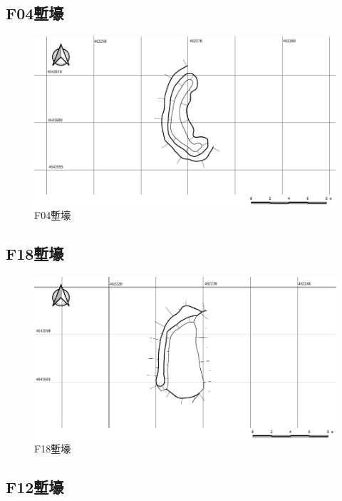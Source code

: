 \documentclass[14Q]{jsarticle}
\begin{document}
\subsection{F04塹壕}

\begin{figure}[h]
\centering
\includegraphics[width=160truemm]{fig/F04.pdf}
\caption{F04塹壕}
\label{f04}
\end{figure}

\subsection{F18塹壕}

\begin{figure}[h]
\centering
\includegraphics[width=160truemm]{fig/F18.pdf}
\caption{F18塹壕}
\label{f18}
\end{figure}

\subsection{F12塹壕}
\end{document}
